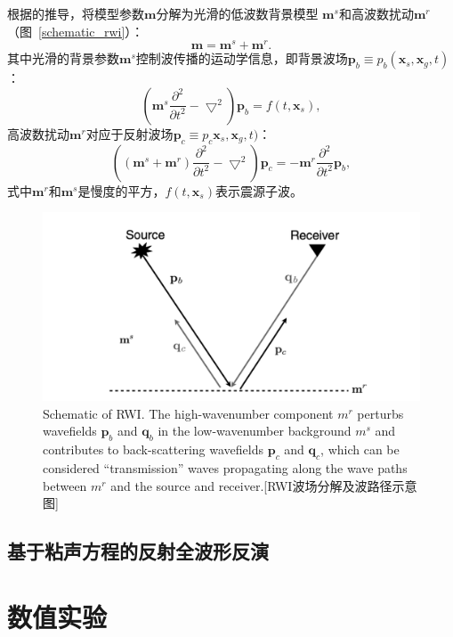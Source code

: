 根据的推导，将模型参数$\mathbf{m}$分解为光滑的低波数背景模型
$\mathbf{m}^s$和高波数扰动$\mathbf{m}^r$（图~\ref{schematic_rwi}）：
\begin{equation}
	\mathbf{m}=\mathbf{m}^s+\mathbf{m}^r.
\end{equation}
其中光滑的背景参数$\mathbf{m}^s$控制波传播的运动学信息，即背景波场$\mathbf{p}_b
\equiv p_b(\mathbf{x}_s,\mathbf{x}_g,t)$：
\begin{equation}
	\left(\mathbf{m}^s\frac{\partial^2}{\partial t^2}-\bigtriangledown^2\right)\mathbf{p}_b
	=f(t,\mathbf{x}_s),
\end{equation}
高波数扰动$\mathbf{m}^r$对应于反射波场$\mathbf{p}_c\equiv p_c\mathbf{x}_s,\mathbf{x}_g,t)$：
\begin{equation}
	\left((\mathbf{m}^s+\mathbf{m}^r)\frac{\partial^2}{\partial t^2}-\bigtriangledown^2\right)
	\mathbf{p}_c=-\mathbf{m}^r\frac{\partial^2}{\partial t^2}\mathbf{p}_b,
\end{equation}
式中$\mathbf{m}^r$和$\mathbf{m}^s$是慢度的平方，$f(t,\mathbf{x}_s)$表示震源子波。

\begin{figure}[!htbp]
	\centering
	\includegraphics[width=0.7\linewidth]{figure/schematic_rwi}
	{Schematic of RWI. The high-wavenumber component
	$m^r$ perturbs wavefields $\mathbf{p}_b$ and $\mathbf{q}_b$ in the
	low-wavenumber background $m^s$ and contributes to back-scattering
	wavefields $\mathbf{p}_c$ and $\mathbf{q}_c$, which can be considered
	“transmission” waves propagating along the wave paths between $m^r$ and
	the source and receiver.}[RWI波场分解及波路径示意图]
	\label{fig:schematic_rwi}
\end{figure}

\vspace{0.5cm}
\subsection{基于粘声方程的反射全波形反演}
\vspace{0.5cm}

\section{数值实验}

